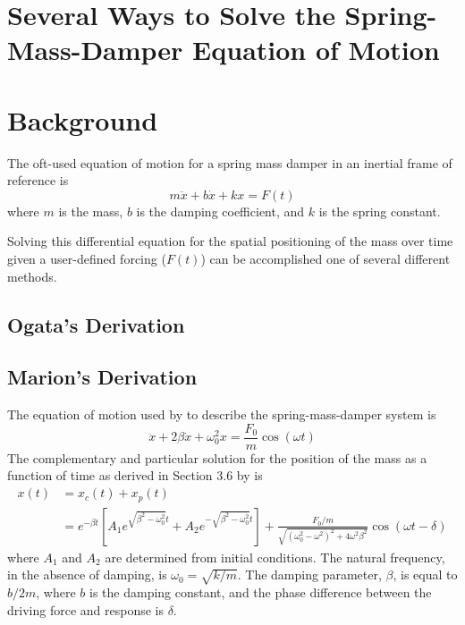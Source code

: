 \documentclass[10pt,letterpaper]{article}
\author{Baker Potts}
\begin{document}
\section*{Several Ways to Solve the Spring-Mass-Damper Equation of Motion}

\section{Background}
The oft-used equation of motion for a spring mass damper in an inertial frame of reference is
\begin{equation}
	m\ddot{x} + b\dot{x} + kx = F(t)
	\label{eq:smd_eom}
\end{equation}
where $m$ is the mass, $b$ is the damping coefficient, and $k$ is the spring constant.

Solving this differential equation for the spatial positioning of the mass over time given a user-defined forcing ($F(t)$) can be accomplished one of several different methods.

\subsection{Ogata's Derivation}

\subsection{Marion's Derivation}
The equation of motion used by \citet{marion95.1} to describe the spring-mass-damper system is 
\begin{equation}
	\ddot{x} + 2\beta\dot{x} + \omega_0^2 x = \frac{F_0}{m}\cos(\omega t)
\end{equation}
The complementary and particular solution for the position of the mass as a function of time as derived in Section 3.6 by \citet{marion95.1} is
\begin{align}
	x(t) &= x_c(t) + x_p(t) \\
	&= e^{-\beta t} \left[ A_1 e^{\sqrt{\beta^2 - \omega_0^2}t} + A_2 e^{-\sqrt{\beta^2 - \omega_0^2}t} \right] + \frac{F_0/m}{\sqrt{(\omega_0^2-\omega^2)^2 + 4\omega^2\beta^2}}\cos(\omega t - \delta)
\end{align}
where $A_1$ and $A_2$ are determined from initial conditions.
The natural frequency, in the absence of damping, is $\omega_0 = \sqrt{k/m}$.
The damping parameter, $\beta$, is equal to $b/2m$, where $b$ is the damping constant, and the phase difference between the driving force and response is $\delta$.
\end{document}
